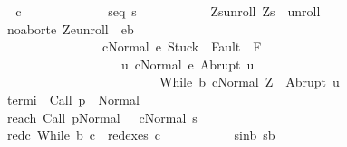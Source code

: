 \begin{isabellebody}
\ \ \ \ \ \ \ \ \isamarkupfalse%
\ \isamarkupfalse%
\ c{\isacharprime}\ \ \ \isanewline
\ \ \ \ \ \ \ \ \ \ s{\isacharunderscore}eq{\isacharunderscore}{\isasymtau}{\isacharcolon}\ {\isachardoublequoteopen}s{\isacharequal}{\isasymtau}{\isachardoublequoteclose}\ \isanewline
\ \ \ \ \ \ \ \ \ \ Z{\isacharunderscore}s{\isacharunderscore}unroll{\isacharcolon}\ {\isachardoublequoteopen}{\isacharparenleft}Z{\isacharcomma}s{\isacharparenright}\ {\isasymin}\ {\isacharquery}unroll{\isachardoublequoteclose}\ \isanewline
\ \ \ \ \ \ \ \ \ \ noabort{\isacharcolon}{\isachardoublequoteopen}{\isasymforall}e{\isachardot}\ {\isacharparenleft}Z{\isacharcomma}e{\isacharparenright}{\isasymin}{\isacharquery}unroll\ {\isasymlongrightarrow}\ e{\isasymin}b\isanewline
\ \ \ \ \ \ \ \ \ \ \ \ \ \ \ \ \ \ \ \ \ \ \ \ {\isasymlongrightarrow}\ {\isasymGamma}{\isasymturnstile}{\isasymlangle}c{\isacharcomma}Normal\ e{\isasymrangle}\ {\isasymRightarrow}{\isasymnotin}{\isacharparenleft}{\isacharbraceleft}Stuck{\isacharbraceright}\ {\isasymunion}\ Fault\ {\isacharbackquote}\ {\isacharparenleft}{\isacharminus}F{\isacharparenright}{\isacharparenright}\ {\isasymand}\ \isanewline
\ \ \ \ \ \ \ \ \ \ \ \ \ \ \ \ \ \ \ \ \ \ \ \ \ \ \ \ {\isacharparenleft}{\isasymforall}u{\isachardot}\ {\isasymGamma}{\isasymturnstile}{\isasymlangle}c{\isacharcomma}Normal\ e{\isasymrangle}\ {\isasymRightarrow}Abrupt\ u\ {\isasymlongrightarrow}\ \isanewline
\ \ \ \ \ \ \ \ \ \ \ \ \ \ \ \ \ \ \ \ \ \ \ \ \ \ \ \ \ \ \ \ \ \ {\isasymGamma}{\isasymturnstile}{\isasymlangle}While\ b\ c{\isacharcomma}Normal\ Z{\isasymrangle}\ {\isasymRightarrow}\ Abrupt\ u{\isacharparenright}{\isachardoublequoteclose}\ \isanewline
\ \ \ \ \ \ \ \ \ \ termi{\isacharcolon}\ \ {\isachardoublequoteopen}{\isasymGamma}{\isasymturnstile}Call\ p\ {\isasymdown}\ Normal\ {\isasymsigma}{\isachardoublequoteclose}\ \isanewline
\ \ \ \ \ \ \ \ \ \ reach{\isacharcolon}\ {\isachardoublequoteopen}{\isasymGamma}{\isasymturnstile}{\isacharparenleft}Call\ p{\isacharcomma}Normal\ {\isasymsigma}{\isacharparenright}\ {\isasymrightarrow}\isactrlsup {\isacharplus}\ {\isacharparenleft}c{\isacharprime}{\isacharcomma}Normal\ s{\isacharparenright}{\isachardoublequoteclose}\ \isanewline
\ \ \ \ \ \ \ \ \ \ red{\isacharunderscore}c{\isacharprime}{\isacharcolon}\ {\isachardoublequoteopen}While\ b\ c\ {\isasymin}\ redexes\ c{\isacharprime}{\isachardoublequoteclose}\ \isanewline
\ \ \ \ \ \ \ \ \ \ s{\isacharunderscore}in{\isacharunderscore}b{\isacharcolon}\ {\isachardoublequoteopen}s{\isasymin}b{\isachardoublequoteclose}\ \isanewline

\end{isabellebody}
